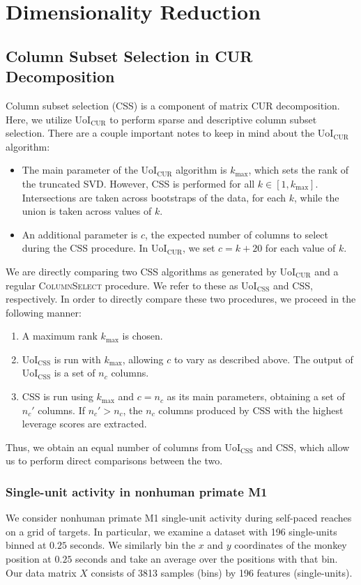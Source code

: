 \documentclass[11pt]{article}
\begin{document}
\newpage 
\section{Dimensionality Reduction}

\subsection{Column Subset Selection in CUR Decomposition}
Column subset selection (CSS) is a component of matrix CUR decomposition. Here, we utilize UoI$_{\text{CUR}}$ to perform sparse and descriptive column subset selection. There are a couple important notes to keep in mind about the UoI$_{\text{CUR}}$ algorithm: 
\begin{itemize}
	\item The main parameter of the UoI$_{\text{CUR}}$ algorithm is $k_{\text{max}}$, which sets the rank of the truncated SVD. However, CSS is performed for all $k \in \left[1, k_{\text{max}}\right]$. Intersections are taken across bootstraps of the data, for each $k$, while the union is taken across values of $k$. 
	\item An additional parameter is $c$, the expected number of columns to select during the CSS procedure. In UoI$_{\text{CUR}}$, we set $c=k+20$ for each value of $k$.
\end{itemize}
We are directly comparing two CSS algorithms as generated by UoI$_{\text{CUR}}$ and a regular \textsc{ColumnSelect} procedure. We refer to these as UoI$_{\text{CSS}}$ and CSS, respectively. In order to directly compare these two procedures, we proceed in the following manner:
\begin{enumerate}[label=\textbf{(\arabic*)}]
	\item A maximum rank $k_{\text{max}}$ is chosen.
	\item UoI$_{\text{CSS}}$ is run with $k_{\text{max}}$, allowing $c$ to vary as described above. The output of UoI$_{\text{CSS}}$ is a set of $n_c$ columns.
	\item CSS is run using $k_{\text{max}}$ and $c=n_c$ as its main parameters, obtaining a set of $n_c'$ columns. If $n_c' > n_c$, the $n_c$ columns produced by CSS with the highest leverage scores are extracted.
\end{enumerate}
Thus, we obtain an equal number of columns from UoI$_{\text{CSS}}$ and CSS, which allow us to perform direct comparisons between the two.

\subsubsection{Single-unit activity in nonhuman primate M1}
We consider nonhuman primate M1 single-unit activity during self-paced reaches on a grid of targets. In particular, we examine a dataset with 196 single-units binned at $0.25$ seconds. We similarly bin the $x$ and $y$ coordinates of the monkey position at $0.25$ seconds and take an average over the positions with that bin. Our data matrix $X$ consists of 3813 samples (bins) by 196 features (single-units).
\end{document}
